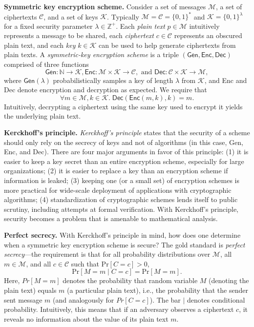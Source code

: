 \documentclass{article}
\theoremstyle{definition}
\begin{document}
\textbf{Symmetric key encryption scheme.} 
Consider a set of messages $\mathcal{M}$, a set of ciphertexts $\mathcal{C}$, and a set of keys $\mathcal{K}$. 
Typically $\mathcal{M} = \mathcal{C} = \{0, 1\}^*$ and $\mathcal{K} = \{0,1\}^\lambda$ 
for a fixed security parameter $\lambda \in \mathbb{Z}^+$. 
Each \textit{plain text} $p \in \mathcal{M}$ intuitively represents a message to be shared, 
each \emph{ciphertext} $c \in \mathcal{C}$ represents an obscured plain text, 
and each \emph{key} $k \in \mathcal{K}$ can be used to help generate ciphertexts from plain texts. 
A \emph{symmetric-key encryption scheme} is a triple $(\mathsf{Gen}, \mathsf{Enc}, \mathsf{Dec})$ 
comprised of three functions  
$$\textsf{Gen} : \mathbb{N} \rightarrow \mathcal{K}, \textsf{Enc} : \mathcal{M} \times \mathcal{K} \rightarrow \mathcal{C}, 
\text{ and }\textsf{Dec} : \mathcal{C} \times \mathcal{K} \rightarrow \mathcal{M},$$
where $\textsf{Gen}(\lambda)$ probabilistically samples a key of length $\lambda$ from 
$\mathcal{K}$, and \textsf{Enc} and \textsf{Dec} denote encryption and decryption as expected. 
We require that 
$$\forall m \in \mathcal{M}, k \in \mathcal{K}.\;\mathsf{Dec}(\mathsf{Enc}(m, k), k) = m.$$ 
Intuitively, decrypting a ciphertext using the same key used to encrypt it yields the underlying plain text.

\textbf{Kerckhoff's principle.} \textit{Kerckhoff's principle} states that the security of a scheme 
should only rely on the secrecy of keys and not of  algorithms (in this case, \textsf{Gen}, \textsf{Enc}, and \textsf{Dec}). 
There are four major arguments in favor of this principle: 
(1) it is easier to keep a key secret than an entire encryption scheme, especially for large organizations; 
(2) it is easier to replace a key than an encryption scheme if information is leaked; 
(3) keeping one (or a small set) of encryption schemes is more practical 
for wide-scale deployment of applications with cryptographic algorithms; 
(4) standardization of cryptographic schemes lends itself to public scrutiny, including attempts at formal verification. 
With Kerckhoff's principle, security becomes a problem that is amenable to mathematical analysis.

\textbf{Perfect secrecy.} With Kerckhoff's principle in mind, 
how does one determine when a symmetric key encryption scheme is secure? 
The gold standard is \textit{perfect secrecy}---the requirement is that for all probability distributions 
over $\mathcal{M}$, all $m \in \mathcal{M}$, and all $c \in \mathcal{C}$ such that $\text{Pr}[C=c] > 0$, 
$$\text{Pr}[M=m \mid C=c] = \text{Pr}[M=m].$$ 
Here, $Pr[M=m]$ denotes the probability that random variable $M$ (denoting the plain text) equals $m$
(a particular plain text), i.e., the probability that the sender sent message $m$ (and analogously for $Pr[C=c]$).
The bar $|$ denotes conditional probability.
Intuitively, this means that if an adversary observes a ciphertext $c$, 
it reveals no information about the value of its plain text $m$. 
\end{document}
